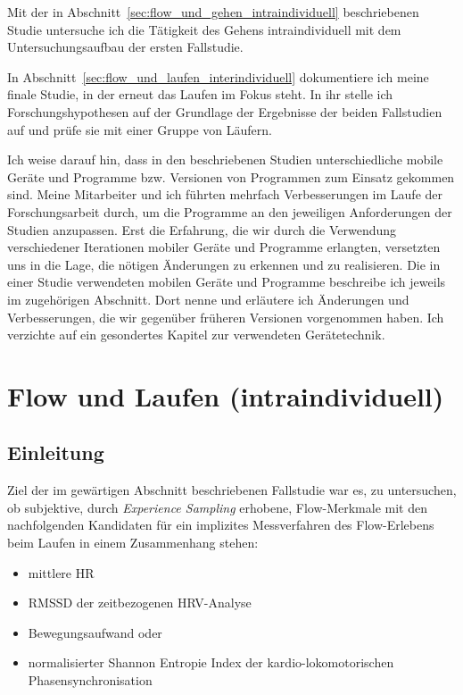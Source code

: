 Mit der in Abschnitt~\ref{sec:flow_und_gehen_intraindividuell} beschriebenen Studie untersuche ich die Tätigkeit des Gehens intraindividuell mit dem Untersuchungsaufbau der ersten Fallstudie.

In Abschnitt~\ref{sec:flow_und_laufen_interindividuell} dokumentiere ich meine finale Studie, in der erneut das Laufen im Fokus steht. In ihr stelle ich Forschungshypothesen auf der Grundlage der Ergebnisse der beiden Fallstudien auf und prüfe sie mit einer Gruppe von Läufern.

Ich weise darauf hin, dass in den beschriebenen Studien unterschiedliche mobile Geräte und Programme bzw. Versionen von Programmen zum Einsatz gekommen sind. Meine Mitarbeiter und ich führten mehrfach Verbesserungen im Laufe der Forschungsarbeit durch, um die Programme an den jeweiligen Anforderungen der Studien anzupassen. Erst die Erfahrung, die wir durch die Verwendung verschiedener Iterationen mobiler Geräte und Programme erlangten, versetzten uns in die Lage, die nötigen Änderungen zu erkennen und zu realisieren. Die in einer Studie verwendeten mobilen Geräte und Programme beschreibe ich jeweils im zugehörigen Abschnitt. Dort nenne und erläutere ich Änderungen und Verbesserungen, die wir gegenüber früheren Versionen vorgenommen haben. Ich verzichte auf ein gesondertes Kapitel zur verwendeten Gerätetechnik.

\section{Flow und Laufen (intraindividuell)}
\label{sec:flow_und_laufen_intraindividuell}
\subsection{Einleitung}
Ziel der im gewärtigen Abschnitt beschriebenen Fallstudie war es, zu untersuchen, ob subjektive, durch \emph{Experience Sampling} erhobene, Flow-Merkmale mit den nachfolgenden Kandidaten für ein implizites Messverfahren des Flow-Erlebens beim Laufen in einem Zusammenhang stehen:

\begin{itemize}
	\item mittlere HR
	\item \acs{RMSSD} der zeitbezogenen \ac{HRV}-Analyse
	\item Bewegungsaufwand oder
	\item normalisierter Shannon Entropie Index der kardio-lokomotorischen Phasensynchronisation
\end{itemize}

